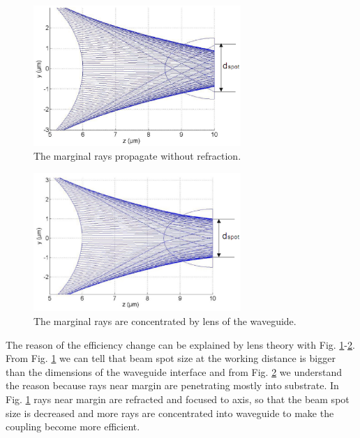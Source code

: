 \begin{figure}[!ht]
\centering
\includegraphics[width=0.7\textwidth]{bilder/beam_ray_without_refract}
\caption{The marginal rays propagate without refraction.}
\label{fig:matlab_coupling_lenses_rxx}
\end{figure}
\begin{figure}[!ht]
\centering
\includegraphics[width=0.7\textwidth]{bilder/beam_ray_refract}
\caption{The marginal rays are concentrated by lens of the waveguide.}
\label{fig:matlab_coupling_lenses_rxx2}
\end{figure}
The reason of the efficiency change can be explained by lens theory with Fig.  \ref{fig:matlab_coupling_lenses_rxx}-\ref{fig:matlab_coupling_lenses_rxx2}. From Fig. \ref{fig:matlab_coupling_lenses_rxx} we can tell that beam spot size at the working distance is bigger than the dimensions of the waveguide interface and from Fig. \ref{fig:matlab_coupling_lenses_rxx2} we understand the reason because rays near margin are penetrating mostly into substrate. In Fig. \ref{fig:matlab_coupling_lenses_rxx} rays near margin are refracted and focused to axis, so that the beam spot size is decreased and more rays are concentrated into waveguide to make the coupling become more efficient.\\
  
